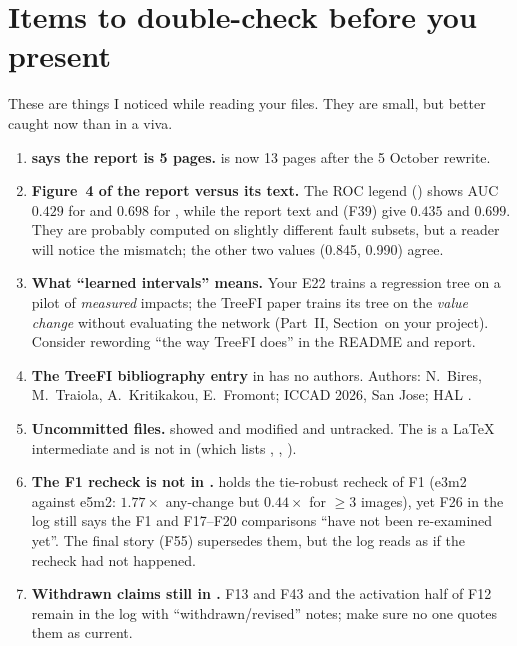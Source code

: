 \section{Items to double-check before you present}
\label{app:check}
These are things I noticed while reading your files. They are small, but better caught now than in a viva.
\begin{enumerate}
\item \textbf{ says the report is 5 pages.}  is now 13 pages after the 5 October rewrite.
\item \textbf{Figure~4 of the report versus its text.} The ROC legend () shows AUC $0.429$ for  and $0.698$ for , while the report text and  (F39) give $0.435$ and $0.699$. They are probably computed on slightly different fault subsets, but a reader will notice the mismatch; the other two values (0.845, 0.990) agree.
\item \textbf{What ``learned intervals'' means.} Your E22 trains a regression tree on a pilot of \emph{measured} impacts; the TreeFI paper trains its tree on the \emph{value change} without evaluating the network (Part~II, Section~on your project). Consider rewording ``the way TreeFI does'' in the README and report.
\item \textbf{The TreeFI bibliography entry} in  has no authors. Authors: N.\ Bires, M.\ Traiola, A.\ Kritikakou, E.\ Fromont; ICCAD 2026, San Jose; HAL .
\item \textbf{Uncommitted files.}  showed  and  modified and  untracked. The  is a LaTeX intermediate and is not in  (which lists , , ).
\item \textbf{The F1 recheck is not in .}  holds the tie-robust recheck of F1 (e3m2 against e5m2: $1.77\times$ any-change but $0.44\times$ for $\ge3$ images), yet F26 in the log still says the F1 and F17--F20 comparisons ``have not been re-examined yet''. The final story (F55) supersedes them, but the log reads as if the recheck had not happened.
\item \textbf{Withdrawn claims still in .} F13 and F43 and the activation half of F12 remain in the log with ``withdrawn/revised'' notes; make sure no one quotes them as current.
\end{enumerate}

